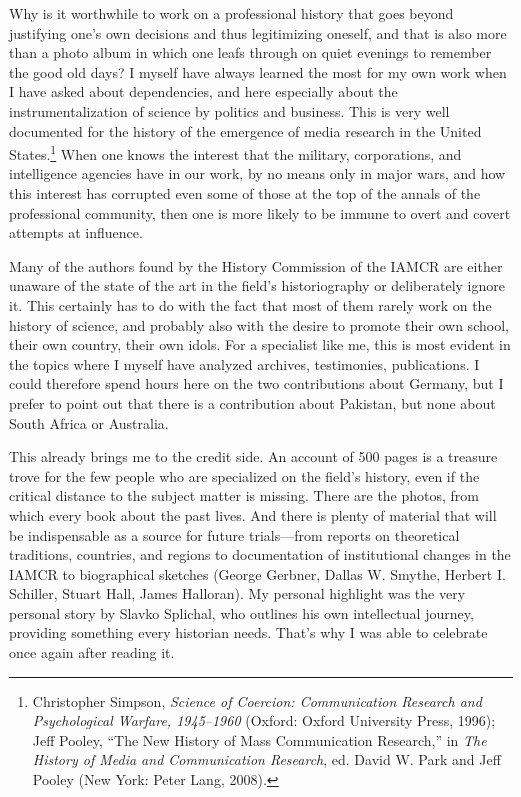 \documentclass{tufte-handout}
\begin{document}
Why is it worthwhile to work on a professional history that goes beyond
justifying one's own decisions and thus legitimizing oneself, and that
is also more than a photo album in which one leafs through on quiet
evenings to remember the good old days? I myself have always learned the
most for my own work when I have asked about dependencies, and here
especially about the instrumentalization of science by politics and
business. This is very well documented for the history of the emergence
of media research in the United States.\footnote{Christopher Simpson,
  \emph{Science of Coercion: Communication Research and Psychological
  Warfare, 1945--1960} (Oxford: Oxford University Press, 1996); Jeff
  Pooley, ``The New History of Mass Communication Research,'' in
  \emph{The History of Media and Communication Research}, ed. David W.
  Park and Jeff Pooley (New York: Peter Lang, 2008).} When one knows the
interest that the military, corporations, and intelligence agencies have
in our work, by no means only in major wars, and how this interest has
corrupted even some of those at the top of the annals of the
professional community, then one is more likely to be immune to overt
and covert attempts at influence.

Many of the authors found by the History Commission of the IAMCR are
either unaware of the state of the art in the field's historiography or
deliberately ignore it. This certainly has to do with the fact that most
of them rarely work on the history of science, and probably also with
the desire to promote their own school, their own country, their own
idols. For a specialist like me, this is most evident in the topics
where I myself have analyzed archives, testimonies, publications. I
could therefore spend hours here on the two contributions about Germany,
but I prefer to point out that there is a contribution about Pakistan,
but none about South Africa or Australia.

This already brings me to the credit side. An account of 500 pages is a
treasure trove for the few people who are specialized on the field's
history, even if the critical distance to the subject matter is missing.
There are the photos, from which every book about the past lives. And
there is plenty of material that will be indispensable as a source for
future trials---from reports on theoretical traditions, countries, and
regions to documentation of institutional changes in the IAMCR to
biographical sketches (George Gerbner, Dallas W. Smythe, Herbert I.
Schiller, Stuart Hall, James Halloran). My personal highlight was the
very personal story by Slavko Splichal, who outlines his own
intellectual journey, providing something every historian needs. That's
why I was able to celebrate once again after reading it.
\end{document}

